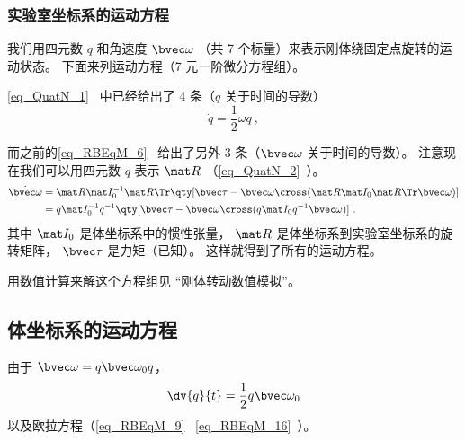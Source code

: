 
\begin{issues}
\issueAbstract
\end{issues}


\subsubsection{实验室坐标系的运动方程}
我们用四元数 $q$ 和角速度 $\bvec \omega$ （共 7 个标量）来表示刚体绕固定点旋转的运动状态。 下面来列运动方程（7 元一阶微分方程组）。

\autoref{eq_QuatN_1}~ 中已经给出了 4 条（$q$ 关于时间的导数）
\begin{equation}
\dot{q} = \frac12 \omega q~,
\end{equation}

而之前的\autoref{eq_RBEqM_6}~ 给出了另外 3 条（$\bvec\omega$ 关于时间的导数）。 注意现在我们可以用四元数 $q$ 表示 $\mat R$ （\autoref{eq_QuatN_2}~）。
\begin{equation}
\begin{aligned}
\dot{\bvec \omega} &= \mat R \mat I_0^{-1} \mat R\Tr \qty[\bvec \tau  - \bvec\omega\cross(\mat R \mat I_0 \mat R\Tr \bvec\omega)]\\
&= q \mat I_0^{-1} q^{-1} \qty[\bvec \tau  - \bvec\omega\cross(q \mat I_0 q^{-1}\bvec\omega)]~.
\end{aligned}
\end{equation}
其中 $\mat I_0$ 是体坐标系中的惯性张量， $\mat R$ 是体坐标系到实验室坐标系的旋转矩阵， $\bvec\tau$ 是力矩（已知）。 这样就得到了所有的运动方程。

用数值计算来解这个方程组见 “刚体转动数值模拟”。

\subsection{体坐标系的运动方程}
由于 $\bvec\omega = q\bvec\omega_0 q$，
\begin{equation}
\dv{q}{t} = \frac12 q \bvec \omega_0
\end{equation}
以及欧拉方程（\autoref{eq_RBEqM_9}~ \autoref{eq_RBEqM_16}~）。
